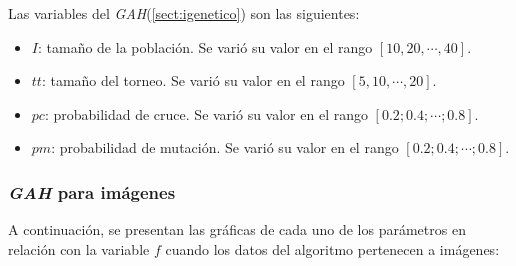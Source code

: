     Las variables del \emph{GAH}(\ref{sect:igenetico}) son las siguientes:
\begin{itemize}
    \item $I$: tamaño de la población. Se varió su valor en el rango
$[10, 20, \cdots, 40]$.
    \item $tt$: tamaño del torneo. Se varió su valor en el rango
$[5, 10, \cdots, 20]$.
    \item $pc$: probabilidad de cruce. Se varió su valor en el rango
$[0.2; 0.4; \cdots; 0.8]$.
    \item $pm$: probabilidad de mutación. Se varió su valor en el rango
$[0.2; 0.4; \cdots; 0.8]$.
\end{itemize}

\subsubsection{\emph{GAH} para imágenes}

	A continuación, se presentan las gráficas de cada uno de los
parámetros en relación con la variable $f$ cuando los datos
del algoritmo pertenecen a imágenes:

\begin{figure}[H]
  \centering
  \label{fig:f_ga1}
\end{figure}

